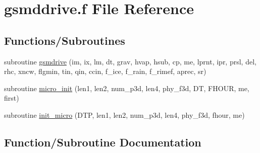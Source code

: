 \hypertarget{gsmddrive_8f}{}\section{gsmddrive.\+f File Reference}
\label{gsmddrive_8f}
\subsection*{Functions/\+Subroutines}
\begin{DoxyCompactItemize}
\item 
subroutine \hyperlink{gsmddrive_8f_afa4aee02bd0f01dde988f4b8621466a7}{gsmdrive} (im, ix, lm, dt, grav, hvap, hsub, cp,                                                                                               me, lprnt, ipr,                                                                                               prsl, del, rhc, xncw, flgmin,                                                                                               tin, qin, ccin,                                                                                               f\+\_\+ice, f\+\_\+rain, f\+\_\+rimef, aprec, sr)
\item 
subroutine \hyperlink{gsmddrive_8f_a545ecb105d9ac23b8913dfbf8655d0a0}{micro\+\_\+init} (len1, len2, num\+\_\+p3d, len4, phy\+\_\+f3d,                                                                                                                                                           DT, F\+H\+O\+UR, me, first)
\item 
subroutine \hyperlink{gsmddrive_8f_ae360e5361d937fd832e108b923f60532}{init\+\_\+micro} (D\+TP, len1, len2, num\+\_\+p3d, len4, phy\+\_\+f3d, fhour, me)
\end{DoxyCompactItemize}


\subsection{Function/\+Subroutine Documentation}
